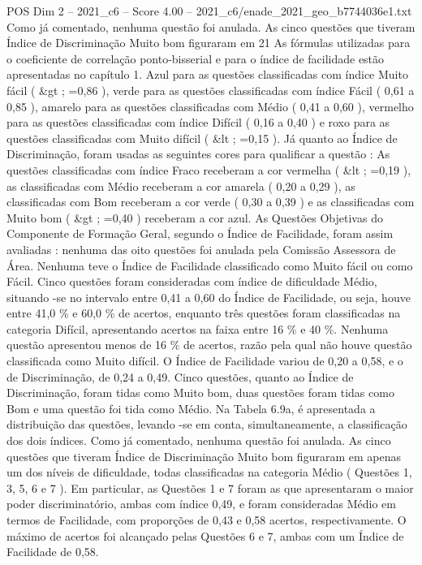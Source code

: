 \begin{textsample}{POS Dim 2 – 2021\_c6 – Score 4.00 – 2021\_c6/enade\_2021\_geo\_b7744036e1.txt}
Como já comentado, nenhuma questão foi anulada.
As cinco questões que tiveram Índice de Discriminação Muito bom figuraram em 21 As fórmulas utilizadas para o coeficiente de correlação ponto-bisserial e para o índice de facilidade estão apresentadas no capítulo 1.
Azul para as questões classificadas com índice Muito fácil ( \&gt ; =0,86 ), verde para as questões classificadas com índice Fácil ( 0,61 a 0,85 ), amarelo para as questões classificadas com Médio ( 0,41 a 0,60 ), vermelho para as questões classificadas com índice Difícil ( 0,16 a 0,40 ) e roxo para as questões classificadas com Muito difícil ( \&lt ; =0,15 ).
Já quanto ao Índice de Discriminação, foram usadas as seguintes cores para qualificar a questão : As questões classificadas com índice Fraco receberam a cor vermelha ( \&lt ; =0,19 ), as classificadas com Médio receberam a cor amarela ( 0,20 a 0,29 ), as classificadas com Bom receberam a cor verde ( 0,30 a 0,39 ) e as classificadas com Muito bom ( \&gt ; =0,40 ) receberam a cor azul.
As Questões Objetivas do Componente de Formação Geral, segundo o Índice de Facilidade, foram assim avaliadas : nenhuma das oito questões foi anulada pela Comissão Assessora de Área.
Nenhuma teve o Índice de Facilidade classificado como Muito fácil ou como Fácil.
Cinco questões foram consideradas com índice de dificuldade Médio, situando -se no intervalo entre 0,41 a 0,60 do Índice de Facilidade, ou seja, houve entre 41,0 \% e 60,0 \% de acertos, enquanto três questões foram classificadas na categoria Difícil, apresentando acertos na faixa entre 16 \% e 40 \%.
Nenhuma questão apresentou menos de 16 \% de acertos, razão pela qual não houve questão classificada como Muito difícil.
O Índice de Facilidade variou de 0,20 a 0,58, e o de Discriminação, de 0,24 a 0,49.
Cinco questões, quanto ao Índice de Discriminação, foram tidas como Muito bom, duas questões foram tidas como Bom e uma questão foi tida como Médio.
Na Tabela 6.9a, é apresentada a distribuição das questões, levando -se em conta, simultaneamente, a classificação dos dois índices.
Como já comentado, nenhuma questão foi anulada.
As cinco questões que tiveram Índice de Discriminação Muito bom figuraram em apenas um dos níveis de dificuldade, todas classificadas na categoria Médio ( Questões 1, 3, 5, 6 e 7 ).
Em particular, as Questões 1 e 7 foram as que apresentaram o maior poder discriminatório, ambas com índice 0,49, e foram consideradas Médio em termos de Facilidade, com proporções de 0,43 e 0,58 acertos, respectivamente.
O máximo de acertos foi alcançado pelas Questões 6 e 7, ambas com um Índice de Facilidade de 0,58.

\end{textsample}
